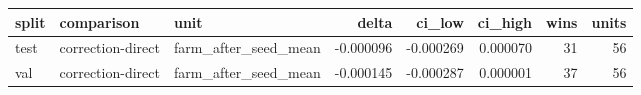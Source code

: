 \begin{tabular}{lllrrrrr}
\toprule
split & comparison & unit & delta & ci\_low & ci\_high & wins & units \\
\midrule
test & correction-direct & farm\_after\_seed\_mean & -0.000096 & -0.000269 & 0.000070 & 31 & 56 \\
val & correction-direct & farm\_after\_seed\_mean & -0.000145 & -0.000287 & 0.000001 & 37 & 56 \\
\bottomrule
\end{tabular}
